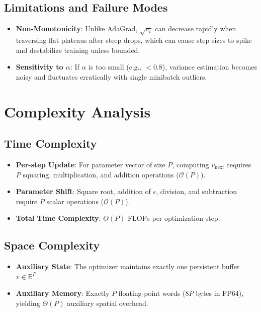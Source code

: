 \documentclass[11pt,a4paper]{article}
\theoremstyle{definition}
\begin{document}
\subsection{Limitations and Failure Modes}
\begin{itemize}
    \item \textbf{Non-Monotonicity}: Unlike AdaGrad, $\sqrt{v_t}$ can decrease rapidly when traversing flat plateaus after steep drops, which can cause step sizes to spike and destabilize training unless bounded.
    \item \textbf{Sensitivity to $\alpha$}: If $\alpha$ is too small (e.g., $< 0.8$), variance estimation becomes noisy and fluctuates erratically with single minibatch outliers.
\end{itemize}

\section{Complexity Analysis}

\subsection{Time Complexity}
\begin{itemize}
    \item \textbf{Per-step Update}: For parameter vector of size $P$, computing $v_{\text{next}}$ requires $P$ squaring, multiplication, and addition operations ($\mathcal{O}(P)$).
    \item \textbf{Parameter Shift}: Square root, addition of $\epsilon$, division, and subtraction require $P$ scalar operations ($\mathcal{O}(P)$).
    \item \textbf{Total Time Complexity}: $\Theta(P)$ FLOPs per optimization step.
\end{itemize}

\subsection{Space Complexity}
\begin{itemize}
    \item \textbf{Auxiliary State}: The optimizer maintains exactly one persistent buffer $v \in \mathbb{R}^P$.
    \item \textbf{Auxiliary Memory}: Exactly $P$ floating-point words ($8P$ bytes in FP64), yielding $\Theta(P)$ auxiliary spatial overhead.
\end{itemize}
\end{document}
